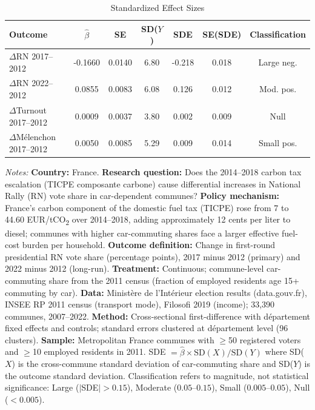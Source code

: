 \begin{table}[t]
\centering
\caption{Standardized Effect Sizes}
\label{tab:sde}
\begin{threeparttable}
\begin{tabular}{lcccccc}
\hline\hline
Outcome & $\hat{\beta}$ & SE & SD($Y$) & SDE & SE(SDE) & Classification \\
\hline
$\Delta$RN 2017--2012 & -0.1660 & 0.0140 & 6.80 & -0.218 & 0.018 & Large neg. \\
$\Delta$RN 2022--2012 & 0.0855 & 0.0083 & 6.08 & 0.126 & 0.012 & Mod. pos. \\
$\Delta$Turnout 2017--2012 & 0.0009 & 0.0037 & 3.80 & 0.002 & 0.009 & Null \\
$\Delta$M\'{e}lenchon 2017--2012 & 0.0050 & 0.0085 & 5.29 & 0.009 & 0.014 & Small pos. \\
\hline\hline
\end{tabular}
\begin{tablenotes}[flushleft]\small
\item \textit{Notes:} \textbf{Country:} France. \textbf{Research question:} Does the 2014--2018 carbon tax escalation (TICPE composante carbone) cause differential increases in National Rally (RN) vote share in car-dependent communes? \textbf{Policy mechanism:} France's carbon component of the domestic fuel tax (TICPE) rose from 7 to 44.60 EUR/tCO\textsubscript{2} over 2014--2018, adding approximately 12 cents per liter to diesel; communes with higher car-commuting shares face a larger effective fuel-cost burden per household. \textbf{Outcome definition:} Change in first-round presidential RN vote share (percentage points), 2017 minus 2012 (primary) and 2022 minus 2012 (long-run). \textbf{Treatment:} Continuous; commune-level car-commuting share from the 2011 census (fraction of employed residents age 15+ commuting by car). \textbf{Data:} Minist\`{e}re de l'Int\'{e}rieur election results (data.gouv.fr), INSEE RP 2011 census (transport mode), Filosofi 2019 (income); 33,390 communes, 2007--2022. \textbf{Method:} Cross-sectional first-difference with d\'{e}partement fixed effects and controls; standard errors clustered at d\'{e}partement level (96 clusters). \textbf{Sample:} Metropolitan France communes with $\geq$50 registered voters and $\geq$10 employed residents in 2011. SDE $= \hat{\beta} \times \text{SD}(X) / \text{SD}(Y)$ where SD($X$) is the cross-commune standard deviation of car-commuting share and SD($Y$) is the outcome standard deviation. Classification refers to magnitude, not statistical significance: Large ($|$SDE$| > 0.15$), Moderate ($0.05$--$0.15$), Small ($0.005$--$0.05$), Null ($< 0.005$).
\end{tablenotes}
\end{threeparttable}
\end{table}

